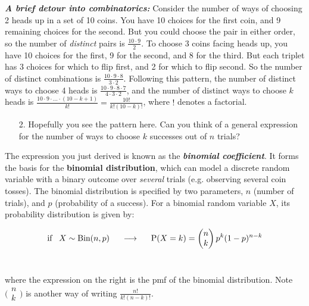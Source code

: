 \documentclass[10pt]{extarticle}
\newcommand{\bfit}[1]{\textbf{\textit{#1}}}
\renewcommand{\P}{\text{P}}
\begin{document}
{\bfit{A brief detour into combinatorics:}} Consider the number of ways of choosing 2 heads up in a set of 10 coins. You have 10 choices for the first coin, and 9 remaining choices for the second. But you could choose the pair in either order, so the number of {\it distinct} pairs is $\frac{10 \cdot 9}{2}$. To choose 3 coins facing heads up, you have 10 choices for the first, 9 for the second, and 8 for the third. But each triplet has 3 choices for which to flip first, and 2 for which to flip second. So the number of distinct combinations is $\frac{10 \cdot 9 \cdot 8}{3 \cdot 2}$. Following this pattern, the number of distinct ways to choose 4 heads is $\frac{10\cdot 9 \cdot 8 \cdot 7}{4\cdot 3 \cdot 2}$, and the number of distinct ways to choose $k$ heads is $\frac{10 \cdot 9 \cdot ... \cdot (10-k+1)}{k!} = \frac{10!}{k!(10-k)!}$, where $!$ denotes a factorial.  

\hfill 

\begin{itemize}

	\item[2.] Hopefully you see the pattern here. Can you think of a general expression for the number of ways to choose $k$ successes out of $n$ trials?  

\end{itemize}

\hfill 

The expression you just derived is known as the {\bfit{binomial coefficient}}. It forms the basis for the {\bf binomial distribution}, which can model a discrete random variable with a binary outcome over {\it several} trials (e.g. observing several coin tosses). The binomial distribution is specified by two parameters, $n$ (number of trials), and $p$ (probability of a success). For a binomial random variable $X$, its probability distribution is given by:  

$$\text{if} \;\;\; X \sim \text{Bin}(n,p) \hspace{0.5cm} \longrightarrow \hspace{0.5cm} \P(X = k) = \begin{pmatrix} n \\ k \end{pmatrix} p^k (1-p)^{n-k}$$ \ 

where the expression on the right is the pmf of the binomial distribution. Note $\big( \begin{smallmatrix} n \\ k \end{smallmatrix} \big) $ is another way of writing $\frac{n!}{k!(n-k)!}$.  
\end{document}
